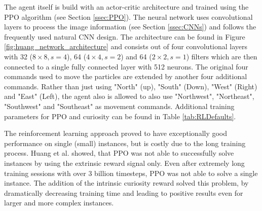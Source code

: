 The agent itself is build with an actor-critic architecture and trained using the PPO algorithm (see Section \ref{ssec:PPO}). The neural network uses convolutional layers to process the image information (see Section \ref{ssec:CNNs}) and follows the frequently used natural CNN design. The architecture can be found in Figure \ref{fig:huang_network_architecture} and consists out of four convolutional layers with 32 ($8\times 8, s=4$), 64 ($4\times 4, s=2$) and 64 ($2\times 2, s=1$) filters which are then connected to a single fully connected layer with 512 neurons. The original four commands used to move the particles are extended by another four additional commands. Rather than just using "North" (up), "South" (Down), "West" (Right) and "East" (Left), the agent also is allowed to also use "Northwest", "Northeast", "Southwest" and "Southeast" as movement commands. Additional training parameters for PPO and curiosity can be found in Table \ref{tab:RLDefaults}.

The reinforcement learning approach proved to have exceptionally good performance on single (small) instances, but is costly due to the long training process. Huang et al. showed, that PPO was not able to successfully solve instances by using the extrinsic reward signal only. Even after extremely long training sessions with over 3 billion timesteps, PPO was not able to solve a single instance. The addition of the intrinsic curiosity reward solved this problem, by dramatically decreasing training time and leading to positive results even for larger and more complex instances.
